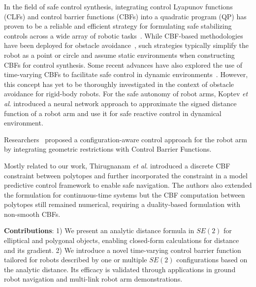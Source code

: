 In the field of safe control synthesis, integrating control Lyapunov functions (CLFs) and control barrier functions (CBFs) into a quadratic program (QP) has proven to be a reliable and efficient strategy for formulating safe stabilizing controls across a wide array of robotic tasks~\cite{glotfelter2017nonsmooth, grandia_2021_legged, wang2017_aerial}. While CBF-based methodologies have been deployed for obstacle avoidance~\cite{srinivasan2020synthesis, Long_learningcbf_ral21, almubarak2022safety, dawson2022learning, abdi2023safe}, such strategies typically simplify the robot as a point or circle and assume static environments when constructing CBFs for control synthesis. Some recent advances have also explored the use of time-varying CBFs to facilitate safe control in dynamic environments~\cite{he2021rule, molnar2022safety, hamdipoor2023safe}. However, this concept has yet to be thoroughly investigated in the context of obstacle avoidance for rigid-body robots. For the safe autonomy of robot arms, Koptev \textit{et al}.\cite{Koptev2023_neural_joint_control} introduced a neural network approach to approximate the signed distance function of a robot arm and use it for safe reactive control in dynamical environment. 




Researchers~\cite{ding2022configurationaware} proposed a configuration-aware control approach for the robot arm by integrating geometric restrictions with Control Barrier Functions. 



Mostly related to our work, Thirugnanam \textit{et al}. \cite{discrete_polytope_cbf} introduced a discrete CBF constraint between polytopes and further incorporated the constraint in a model predictive control framework to enable safe navigation. The authors \cite{polytopic_cbf} also extended the formulation for continuous-time systems but the CBF computation between polytopes still remained numerical, requiring a duality-based formulation with non-smooth CBFs. 




\textbf{Contributions}: 1) We present an analytic distance formula in $SE(2)$ for elliptical and polygonal objects, enabling closed-form calculations for distance and its gradient. 2) We introduce a novel time-varying control barrier function tailored for robots described by one or multiple $SE(2)$ configurations based on the analytic distance. Its efficacy is validated through applications in ground robot navigation and multi-link robot arm demonstrations.













